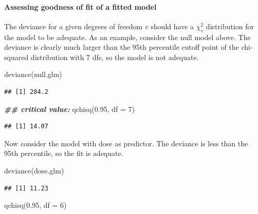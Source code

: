 \documentclass[
  12pt,
]{krantz}
\newenvironment{Shaded}{\begin{snugshade}}{\end{snugshade}}
\newcommand{\AttributeTok}[1]{\textcolor[rgb]{0.77,0.63,0.00}{#1}}
\newcommand{\DecValTok}[1]{\textcolor[rgb]{0.00,0.00,0.81}{#1}}
\newcommand{\DocumentationTok}[1]{\textcolor[rgb]{0.56,0.35,0.01}{\textbf{\textit{#1}}}}
\newcommand{\FloatTok}[1]{\textcolor[rgb]{0.00,0.00,0.81}{#1}}
\newcommand{\FunctionTok}[1]{\textcolor[rgb]{0.00,0.00,0.00}{#1}}
\newcommand{\NormalTok}[1]{#1}
\theoremstyle{definition}
\theoremstyle{definition}
\theoremstyle{definition}
\theoremstyle{definition}
\theoremstyle{remark}
\begin{document}
\hypertarget{assessing-goodness-of-fit-of-a-fitted-model}{%
\paragraph{Assessing goodness of fit of a fitted model}\label{assessing-goodness-of-fit-of-a-fitted-model}}

The deviance for a given degrees of freedom \(v\) should have a \(\chi_v^2\) distribution for the model to be adequate. As an example, consider the null model above. The deviance is clearly much larger than the 95th percentile cutoff point of the chi-squared distribution with 7 dfs, so the model is not adequate.

\begin{Shaded}
\begin{Highlighting}[]
\FunctionTok{deviance}\NormalTok{(null.glm)}
\end{Highlighting}
\end{Shaded}

\begin{verbatim}
## [1] 284.2
\end{verbatim}

\begin{Shaded}
\begin{Highlighting}[]
\DocumentationTok{\#\# critical value:}
\FunctionTok{qchisq}\NormalTok{(}\FloatTok{0.95}\NormalTok{, }\AttributeTok{df =} \DecValTok{7}\NormalTok{)}
\end{Highlighting}
\end{Shaded}

\begin{verbatim}
## [1] 14.07
\end{verbatim}

Now consider the model with dose as predictor. The deviance is less than the 95th percentile, so the fit is adequate.

\begin{Shaded}
\begin{Highlighting}[]
\FunctionTok{deviance}\NormalTok{(dose.glm)}
\end{Highlighting}
\end{Shaded}

\begin{verbatim}
## [1] 11.23
\end{verbatim}

\begin{Shaded}
\begin{Highlighting}[]
\FunctionTok{qchisq}\NormalTok{(}\FloatTok{0.95}\NormalTok{, }\AttributeTok{df =} \DecValTok{6}\NormalTok{)}
\end{Highlighting}
\end{Shaded}
\end{document}
